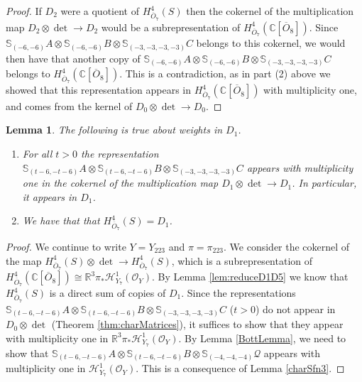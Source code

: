 \documentclass[11pt,reqno]{amsart}
\newcommand{\oo}{\otimes}
\newcommand{\bS}{\mathbb{S}}
\newcommand{\C}{\mathbb{C}}
\renewcommand{\det}{\operatorname{det}}
\newcommand{\mc}[1]{\mathcal{#1}}
\newcommand{\ol}[1]{\overline{#1}}
\newtheorem{lemma}[theorem]{Lemma}
\numberwithin{equation}{section}
\begin{document}
\begin{proof}
If $D_2$ were a quotient of $H^4_{\ol{O}_7}(S)$ then the cokernel of the multiplication map $D_2\oo \det\to D_2$ would be a subrepresentation of $H^4_{\ol{O}_7}(\C[\ol{O}_8])$. Since $\bS_{(-6,-6)}A\oo \bS_{(-6,-6)}B \oo \bS_{(-3,-3,-3,-3)}C$ belongs to this cokernel, we would then have that another copy of $\bS_{(-6,-6)}A\oo \bS_{(-6,-6)}B \oo \bS_{(-3,-3,-3,-3)}C$ belongs to $H^4_{\ol{O}_7}(\C[\ol{O}_8])$. This is a contradiction, as in part (2) above we showed that this representation appears in $H^4_{\ol{O}_7}(\C[\ol{O}_8])$ with multiplicity one, and comes from the kernel of $D_0\oo\det\to D_0$.
\end{proof}





\begin{lemma}\label{lem:infoD17}
The following is true about weights in $D_1$.
\begin{enumerate}
\item For all $t>0$ the representation $\bS_{(t-6,-t-6)}A \oo \bS_{(t-6,-t-6)}B\oo \bS_{(-3,-3,-3,-3)}C$ appears with multiplicity one in the cokernel of the multiplication map $D_1\oo \det \to D_1$. In particular, it	appears in $D_1$.
\item We have that that $H^4_{\ol{O}_7}(S)=D_1$.

\end{enumerate}
	
\end{lemma}


\begin{proof} 
We continue to write $Y=Y_{223}$ and $\pi=\pi_{223}$. We consider the cokernel of the map $H^4_{\ol{O}_7}(S)\otimes \det \to H^4_{\ol{O}_7}(S)$, which is a subrepresentation of $H^4_{\ol{O}_7}(\C[\ol{O}_8])\cong \mathbb{R}^3\pi_{\ast}\mathscr{H}^1_{Y_7}(\mc{O}_Y)$. By Lemma \ref{lem:reduceD1D5} we know that $H^4_{\ol{O}_7}(S)$ is a direct sum of copies of $D_1$. Since the representations $\bS_{(t-6,-t-6)}A \oo \bS_{(t-6,-t-6)}B\oo \bS_{(-3,-3,-3,-3)}C$ ($t>0$) do not appear in $D_0\oo \det$ (Theorem \ref{thm:charMatrices}), it suffices to show that they appear with multiplicity one in $\mathbb{R}^3\pi_{\ast}\mathscr{H}^1_{Y_7}(\mc{O}_Y)$. By Lemma \ref{BottLemma}, we need to show that $\bS_{(t-6,-t-6)}A \oo \bS_{(t-6,-t-6)}B\oo \bS_{(-4,-4,-4)}\mc{Q}$ appears with multiplicity one in $\mathscr{H}^1_{Y_7}(\mc{O}_Y)$. This is a consequence of Lemma \ref{charSfn3}.
\end{proof}
\end{document}
